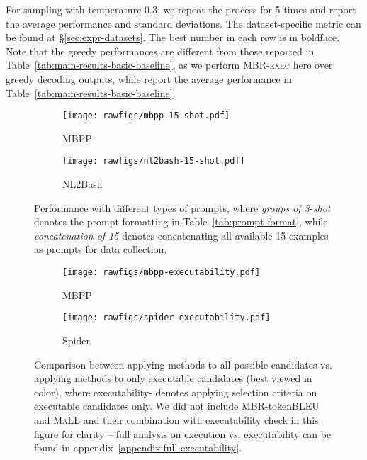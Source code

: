 \documentclass[11pt]{article}
\newcommand{\mbrexec}{\textsc{MBR-exec}\xspace}
\newcommand{\maxavglikelihood}{\textsc{MaLL}\xspace}
\begin{document}
\begin{table}[t]
{    For sampling with temperature 0.3, we repeat the process for 5 times and report the average performance and standard deviations.
    The dataset-specific metric can be found at \S\ref{sec:expr-datasets}.
    The best number in each row is in boldface. 
    Note that the greedy performances are different from those reported in Table~\ref{tab:main-results-basic-baseline}, as we perform \mbrexec here over greedy decoding outputs, while report the average performance in Table~\ref{tab:main-results-basic-baseline}.
}
\end{table} \begin{figure}[t!]
    \centering
    \begin{subfigure}[t]{0.48\textwidth}
        \texttt{[image: rawfigs/mbpp-15-shot.pdf]}
        \caption{MBPP}
    \end{subfigure}
    \begin{subfigure}[t]{0.48\textwidth}
        \texttt{[image: rawfigs/nl2bash-15-shot.pdf]}
        \caption{NL2Bash}
    \end{subfigure}
    \caption{Performance with different types of prompts, where \textit{groups of 3-shot} denotes the prompt formatting in Table~\ref{tab:prompt-format}, while \textit{concatenation of 15} denotes concatenating all available 15 examples as prompts for data collection. }
    \label{fig:15-shot}
\end{figure} \begin{figure}[t]
    \centering
    \begin{subfigure}[t]{0.48\textwidth}
        \texttt{[image: rawfigs/mbpp-executability.pdf]}
        \caption{MBPP}
    \end{subfigure}
    \hspace{-10pt}
    \begin{subfigure}[t]{0.48\textwidth}
        \texttt{[image: rawfigs/spider-executability.pdf]}
        \caption{Spider}
    \end{subfigure}
    \caption{Comparison between applying methods to all possible candidates vs. applying methods to only executable candidates (best viewed in color), where executability- denotes applying selection criteria  on executable candidates only. We did not include MBR-token\textsc{BLEU} and \maxavglikelihood and their combination with executability check in this figure for clarity -- full analysis on execution vs. executability can be found in appendix~\ref{appendix:full-executability}.}
    \label{fig:ablation-executability}

\end{figure}
\end{document}
